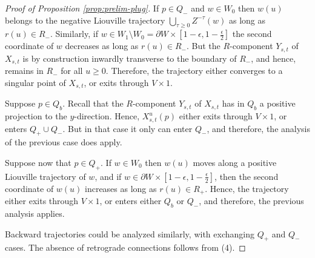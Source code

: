 \documentclass[10pt,a4paper]{amsart}
\newcommand{\eps}{\epsilon}
\newcommand{\p}{\partial}
\begin{document}
\begin{proof}[Proof of Proposition \ref{prop:prelim-plug}]
 If $p\in Q_-$ and $w\in W_0$ then $w(u)$  belongs to the negative Liouville trajectory $\bigcup\limits_{\tau\geq 0}Z^{-\tau}(w)$ as long as $r(u)\in R_-$.
 Similarly, if $w\in W_1\setminus W_0=\p W\times[1-\eps,1-\frac\eps2]$ the second coordinate of $w$ decreases as long as $r(u)\in R_-$.
But  the $R$-component $Y_{s,t}$  of $X_{s,t}$ is by construction inwardly transverse to the boundary of $R_-$, and hence,  remains in $R_-$ for all $u\geq 0$. Therefore, the trajectory either converges to a singular point of $X_{s,t}$, or exits through $V\times 1$.

Suppose $p\in Q_b$. Recall that the  $R$-component $Y_{s,t}$  of $X_{s,t}$ has in $Q_b$ a positive projection to  the  $y$-direction. Hence,  $X_{s,t}^u(p)$  either  exits through $V\times 1$, or enters $Q_+\cup Q_-$. But  in that case it only can enter $Q_-$, and therefore, the analysis of the previous case does apply.
 
 Suppose now that $p\in Q_+$.    If $w\in W_0$ then $w(u)$ moves along a positive Liouville trajectory of $w$, and if  $w\in \p W\times [1-\eps ,1-\frac\eps2]$,  then the second coordinate of $w(u)$ increases   as long as $r(u)\in R_+$. Hence, the trajectory either exits through $V\times 1$, or  enters either $Q_b$ or $Q_-$, and therefore, the previous analysis applies.
 
  Backward trajectories could be analyzed  similarly, with exchanging $Q_+$ and $Q_-$ cases.
 The absence of retrograde connections follows from (4).
 

 \end{proof}
\end{document}

